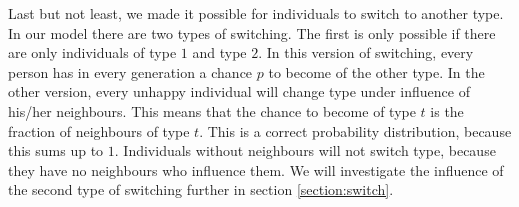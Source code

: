 Last but not least, we made it possible for individuals to switch to another type.
In our model there are two types of switching.
The first is only possible if there are only individuals of type $1$ and type $2$.
In this version of switching, every person has in every generation a chance $p$ to become of the other type.
In the other version, every unhappy individual will change type under influence of his/her neighbours.
This means that the chance to become of type $t$ is the fraction of neighbours of type $t$.
This is a correct probability distribution, because this sums up to $1$.
Individuals without neighbours will not switch type, because they have no neighbours who influence them.
We will investigate the influence of the second type of switching further in section \ref{section:switch}.


